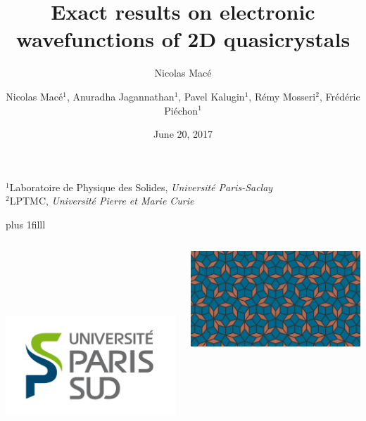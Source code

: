 \documentclass[xcolor=x11names,compress,professionalfonts, aspectratio=169]{beamer}
\author{Nicolas Macé}
\newcommand{\btVFill}{\vskip0pt plus 1filll}%
\renewcommand{\(}{\begin{columns}}
\renewcommand{\)}{\end{columns}}
\newcommand{\<}[1]{\begin{column}{#1}}
\renewcommand{\>}{\end{column}}
\begin{document}
\begin{frame}
\title{{\fontsize{14}{60}\selectfont Exact results on electronic wavefunctions of 2D quasicrystals}}

\author{{\fontsize{10}{60}\selectfont Nicolas Macé$^1$, Anuradha Jagannathan$^1$, Pavel Kalugin$^1$, Rémy Mosseri$^2$, Frédéric Piéchon$^1$}}

\institute %
{
  $^1$Laboratoire de Physique des Solides, \emph{Université Paris-Saclay} \\
  $^2$LPTMC, \emph{Université Pierre et Marie Curie}
}

\date{June 20, 2017}

\titlepage

\btVFill
\begin{columns}
\begin{column}{2cm}
~\\
~\\
~\\
~\\
\raggedright
\includegraphics[scale=.15]{img/0_cover/LogoUPSUD.png}
\end{column}
\begin{column}{6cm}
\centering
\includegraphics[width=.8\textwidth]{img/0_cover/cover.png}

\end{column}
\end{columns}
\end{frame}
\end{document}
